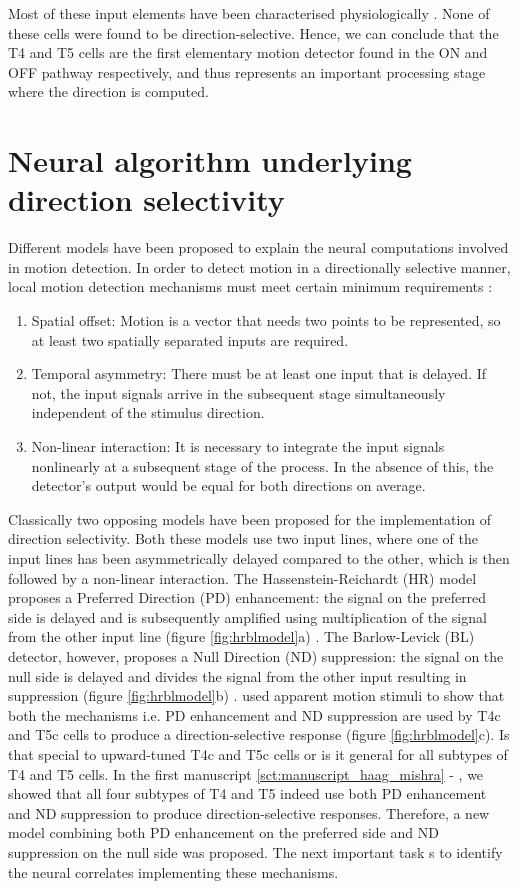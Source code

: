 Most of these input elements have been characterised physiologically \parencite{Arenz2017, Serbe2016, Strother2017, Meier2019, Borst2020}. None of these cells were found to be direction-selective. Hence, we can conclude that the T4 and T5 cells are the first elementary motion detector found in the ON and OFF pathway respectively, and thus represents an important processing stage where the direction is computed.    

\section{Neural algorithm underlying direction selectivity}
Different models have been proposed to explain the neural computations involved in motion detection. In order to detect motion in a directionally selective manner, local motion detection mechanisms must meet certain minimum requirements \parencite{Borst1989}:
\begin{enumerate}
\item Spatial offset: Motion is a vector that needs two points to be represented, so at least two spatially separated inputs are required.
\item Temporal asymmetry: There must be at least one input that is delayed. If not, the input signals arrive in the subsequent stage simultaneously independent of the stimulus direction.
\item Non-linear interaction: It is necessary to integrate the input signals nonlinearly at a subsequent stage of the process. In the absence of this, the detector's output would be equal for both directions on average.
\end{enumerate} 

Classically two opposing models have been proposed for the implementation of direction selectivity. Both these models use two input lines, where one of the input lines has been asymmetrically delayed compared to the other, which is then followed by a non-linear interaction. The Hassenstein-Reichardt (HR) model proposes a Preferred Direction (PD) enhancement: the signal on the preferred side is delayed and is subsequently amplified using multiplication of the signal from the other input line (figure \ref{fig:hrblmodel}a) \parencite{Hassenstein1956}. The Barlow-Levick (BL) detector, however, proposes a Null Direction (ND) suppression: the signal on the null side is delayed and divides the signal from the other input resulting in suppression (figure \ref{fig:hrblmodel}b) \parencite{Barlow1965}. \cite{Haag2016} used apparent motion stimuli to show that both the mechanisms i.e. PD enhancement and ND suppression are used by T4c and T5c cells to produce a direction-selective response (figure \ref{fig:hrblmodel}c). Is that special to upward-tuned T4c and T5c cells or is it general for all subtypes of T4 and T5 cells. In the first manuscript \ref{sct:manuscript_haag_mishra} - \parencite{Haag2017}, we showed that all four subtypes of T4 and T5 indeed use both PD enhancement and ND suppression to produce direction-selective responses. Therefore, a new model combining both PD enhancement on the preferred side and ND suppression on the null side was proposed. The next important task s to identify the neural correlates implementing these mechanisms. 

